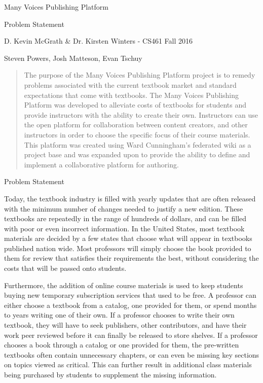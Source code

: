 \documentclass[letterpaper, 10pt, draftclsnofoot, onecolumn]{IEEEtran}
\begin{document}
\begin{titlepage}
\centering
{\huge Many Voices Publishing Platform\par}
{\LARGE Problem Statement\par}
{\vspace{2mm}}
{\large D. Kevin McGrath \& Dr. Kirsten Winters -  CS461 Fall 2016\par}
{\large Steven Powers, Josh Matteson, Evan Tschuy\par}
{\vspace{10mm}}
\begin{abstract}
\noindent  The purpose of the Many Voices Publishing Platform project is to remedy problems 
associated with the current textbook market and standard expectations that come 
with textbooks. The Many Voices Publishing Platform was developed to alleviate 
costs of textbooks for students and provide instructors with the ability 
to create their own. Instructors can use the open platform for collaboration between 
content creators, and other instructors in order to choose the specific focus of their course materials. 
This platform was created using Ward Cunningham's federated wiki as a project 
base and was expanded upon to provide the ability to define and implement a 
collaborative platform for authoring.
\end{abstract}
\end{titlepage}

\vspace{1pc}
\centerline{\sc \large Problem Statement}
\vspace{2pc}

 Today, the textbook industry is filled with yearly updates that are often released with the
minimum number of changes needed to justify a new edition. These textbooks are repeatedly in the range of hundreds of dollars, 
and can be filled with poor or even incorrect information. In the United States, most textbook materials are 
decided by a few states that choose what will appear in textbooks published nation wide. Most professors will
simply choose the book provided to them for review that satisfies their requirements the best, without 
considering the costs that will be passed onto students.
 
Furthermore, the addition of online course materials is used to keep students buying new 
temporary subscription services that used to be free. A professor can either choose a textbook 
from a catalog, one provided for them, or spend months to years writing one of their own. 
If a professor chooses to write their own textbook, they will have to seek publishers,
other contributors, and have their work peer reviewed before it can finally be released to store shelves. 
If a professor chooses a book through a catalog or one provided for them, the pre-written textbooks 
often contain unnecessary chapters, or can even be missing key sections on topics viewed as critical. This can further result in 
additional class materials being purchased by students to supplement the missing information. \\
\end{document}
